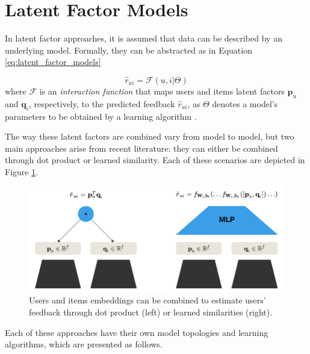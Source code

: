 \section{Latent Factor Models}

In latent factor approaches, it is assumed that data can be described by an underlying model. Formally, they can be abstracted as in Equation \ref{eq:latent_factor_models}

\begin{equation}
    \label{eq:latent_factor_models}
    \hat{r}_{ui} = \mathcal{F}(u,i|\Theta)
\end{equation} where $\mathcal{F}$ is an \textit{interaction function} that maps users and items latent factors $\mathbf{p}_u$ and $\mathbf{q}_i$, respectively, to the predicted feedback $\hat{r}_{ui}$, as $\Theta$ denotes a model's parameters to be obtained by a learning algorithm \cite{10.1145/3038912.3052569}.

The way these latent factors are combined vary from model to model, but two main approaches arise from recent literature: they can either be combined through dot product or learned similarity. Each of these scenarios are depicted in Figure \ref{fig:latent_factors}.

\begin{figure}[ht]
    \centering
    \includegraphics[width=\textwidth]{figs/latent_factors.png}
    \caption{Users and items embeddings can be combined to estimate users' feedback through dot product (left) or learned similarities (right).}
    \label{fig:latent_factors}
\end{figure}


Each of these approaches have their own model topologies and learning algorithms, which are presented as follows.

